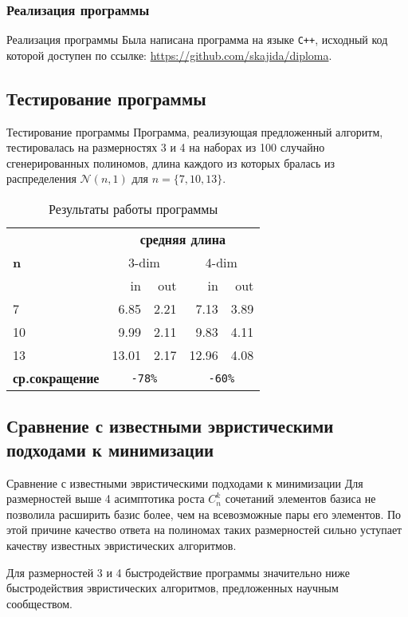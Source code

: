\documentclass{beamer}
\begin{document}
\subsubsection{Реализация программы}
\begin{frame}{Реализация программы}
Была написана программа на языке \texttt{C++}, исходный код которой доступен по ссылке: \url{https://github.com/skajida/diploma}.
\end{frame}

\subsection{Тестирование программы}
\begin{frame}{Тестирование программы}
Программа, реализующая предложенный алгоритм, тестировалась на размерностях 3 и 4 на наборах из 100 случайно сгенерированных полиномов, длина каждого из которых бралась из распределения $ \mathcal{N} (n, 1) $ для $ n = \{ 7, 10, 13 \} $.


\begin{table}
\caption{Результаты работы программы}
\label{table_results}
\centering
\begin{tabular}{ |l||r|r||r|r| } \hline
\multirow{3}{*}{\bf n} & \multicolumn{4}{c|}{\bf средняя длина} \\ \cline{2-5}
    & \multicolumn{2}{c||}{3-dim} & \multicolumn{2}{c|}{4-dim} \\ \cline{2-5}
    & in    & out  & in    & out  \\ \hline \hline
7   & 6.85  & 2.21 & 7.13  & 3.89 \\ \hline
10  & 9.99  & 2.11 & 9.83  & 4.11 \\ \hline
13  & 13.01 & 2.17 & 12.96 & 4.08 \\ \hline \hline
\textbf{ср.сокращение} & \multicolumn{2}{c||}{\tt -78\%} & \multicolumn{2}{c|}{\tt -60\%} \\ \hline
\end{tabular}
\end{table}

\end{frame}

\subsection{Сравнение с известными эвристическими подходами к минимизации}

\begin{frame}{Сравнение с известными эвристическими подходами к минимизации}
Для размерностей выше 4 асимптотика роста $ C_n^k $ сочетаний элементов базиса не позволила расширить базис более, чем на всевозможные пары его элементов. По этой причине качество ответа на полиномах таких размерностей сильно уступает качеству известных эвристических алгоритмов.

Для размерностей 3 и 4 быстродействие программы значительно ниже быстродействия эвристических алгоритмов, предложенных научным сообществом.
\end{frame}
\end{document}
